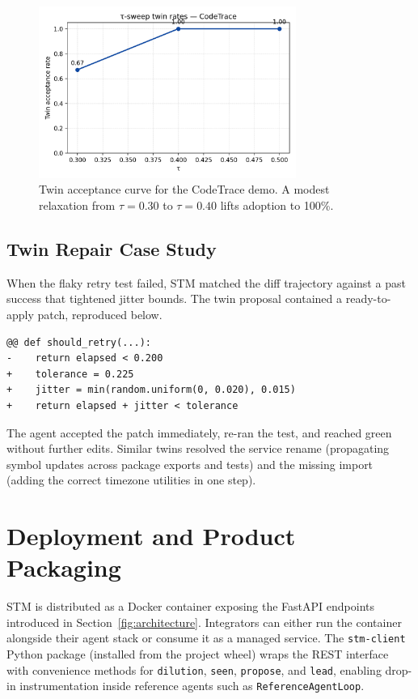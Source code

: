 \documentclass[11pt]{article}
\begin{document}
\begin{figure}[h]
  \centering
  \includegraphics[width=0.75\textwidth]{../note/fig_tau_sweep_codetrace.png}
  \caption{Twin acceptance curve for the CodeTrace demo. A modest relaxation from $\tau=0.30$ to $\tau=0.40$ lifts adoption to 100\%.}
  \label{fig:tau-codetrace}
\end{figure}

\subsection{Twin Repair Case Study}
When the flaky retry test failed, STM matched the diff trajectory against a past success that tightened jitter bounds. The twin proposal contained a ready-to-apply patch, reproduced below.

\begin{lstlisting}[style=stm, caption={Twin patch applied during the flaky retry repair.}, label={lst:retry-twin}]
@@ def should_retry(...):
-    return elapsed < 0.200
+    tolerance = 0.225
+    jitter = min(random.uniform(0, 0.020), 0.015)
+    return elapsed + jitter < tolerance
\end{lstlisting}

The agent accepted the patch immediately, re-ran the test, and reached green without further edits. Similar twins resolved the service rename (propagating symbol updates across package exports and tests) and the missing import (adding the correct timezone utilities in one step).

\section{Deployment and Product Packaging}
STM is distributed as a Docker container exposing the FastAPI endpoints introduced in Section~\ref{fig:architecture}. Integrators can either run the container alongside their agent stack or consume it as a managed service. The \texttt{stm-client} Python package (installed from the project wheel) wraps the REST interface with convenience methods for \texttt{dilution}, \texttt{seen}, \texttt{propose}, and \texttt{lead}, enabling drop-in instrumentation inside reference agents such as \texttt{ReferenceAgentLoop}.
\end{document}
